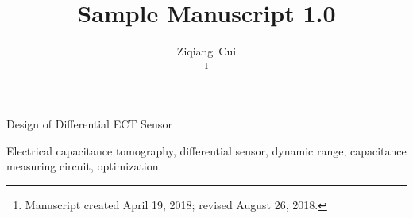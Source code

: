 \documentclass[journal]{IEEEtran}
\begin{document}
%
\title{Sample Manuscript 1.0}
%
%
%

\author{Ziqiang~Cui

\thanks{Manuscript created April 19, 2018; revised August 26, 2018.}}



%
{Design of Differential ECT Sensor}

\maketitle



\begin{IEEEkeywords}
Electrical capacitance tomography, differential sensor, dynamic range, capacitance measuring circuit, optimization.
\end{IEEEkeywords}



















\end{document}
